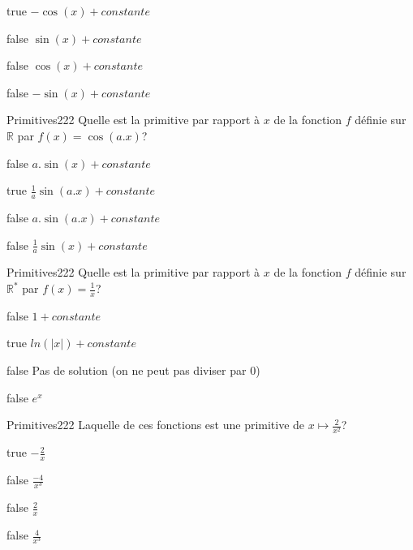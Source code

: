             \begin{reponses}
            	\item[true] $-\cos(x)+constante$
            	\item[false] $\sin(x)+constante$
                \item[false] $\cos(x)+constante$
                \item[false] $-\sin(x)+constante$
            \end{reponses}
        	\begin{question}{61}{Primitives}{2}{22}
				Quelle est la primitive par rapport à $x$ de la fonction $f$ définie sur $\mathbb{R}$ par $f(x)=\cos(a.x)$?
            \end{question}
            \begin{reponses}
            	\item[false] $a.\sin(x)+constante$
            	\item[true] $\frac{1}{a}\sin(a.x)+constante$
                \item[false] $a.\sin(a.x)+constante$
                \item[false] $\frac{1}{a}\sin(x)+constante$
            \end{reponses}
        	\begin{question}{61}{Primitives}{2}{22}
				Quelle est la primitive par rapport à $x$ de la fonction $f$ définie sur $\mathbb{R^*}$ par $f(x)=\frac{1}{x}$?
            \end{question}
            \begin{reponses}
            	\item[false] $1+constante$
            	\item[true] $ln(|x|)+constante$
                \item[false] Pas de solution (on ne peut pas diviser par $0$)
                \item[false] $e^x$
            \end{reponses}
            \begin{question}{61}{Primitives}{2}{22}
                Laquelle de ces fonctions est une primitive de $x\mapsto \frac{2}{x^2}$? 
            \end{question}
            \begin{reponses}
                \item[true] $-\frac{2}{x}$
                \item[false] $\frac{-4}{x^3}$
                \item[false] $\frac{2}{x}$
                \item[false] $\frac{4}{x^3}$
            \end{reponses}
